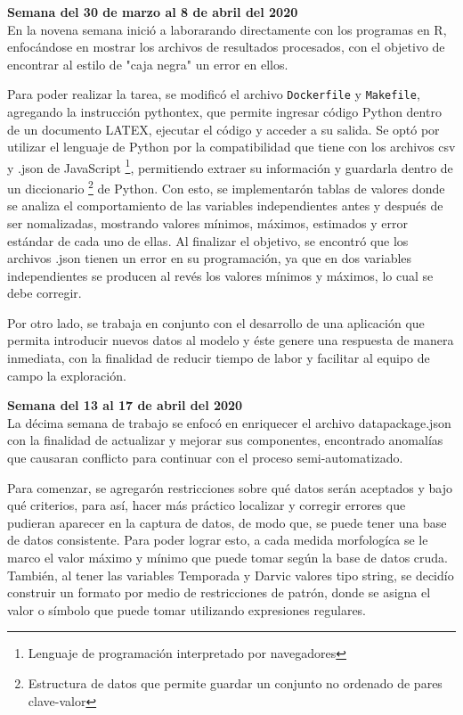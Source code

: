 \documentclass{article}
\begin{document}
    \textbf{Semana  del 30 de marzo al 8 de abril del 2020} \\
    En la novena semana inició a laborarando directamente con los programas en R, enfocándose en mostrar los archivos de resultados procesados, con el objetivo de encontrar al estilo de "caja negra" un error en ellos.
    
    Para poder realizar la tarea, se modificó el archivo \texttt{Dockerfile} y \texttt{Makefile}, agregando la instrucción pythontex, que permite ingresar código Python dentro de un documento LATEX, ejecutar el código y acceder a su salida. Se optó por utilizar el lenguaje de Python por la compatibilidad que tiene con los archivos csv y .json de JavaScript \footnote{Lenguaje de programación interpretado por navegadores}, permitiendo extraer su información y guardarla dentro de un diccionario \footnote{Estructura de datos que permite guardar un conjunto no ordenado de pares clave-valor} de Python. Con esto, se implementarón tablas de valores donde se analiza el comportamiento de las variables independientes antes y después de ser nomalizadas, mostrando valores mínimos, máximos, estimados y error estándar de cada uno de ellas.
    Al finalizar el objetivo, se encontró que los archivos .json tienen un error en su programación, ya que en dos variables independientes se producen al revés los valores mínimos y máximos, lo cual se debe corregir.
    
    Por otro lado, se trabaja en conjunto con el desarrollo de una aplicación que permita introducir nuevos datos al modelo y éste genere una respuesta de manera inmediata, con la finalidad de reducir tiempo de labor y  facilitar al equipo de campo la exploración.
    
    \textbf{Semana del 13 al 17 de abril del 2020} \\
    La décima semana de trabajo se enfocó en enriquecer el archivo datapackage.json con la finalidad de actualizar y mejorar sus componentes, encontrado anomalías que causaran conflicto para continuar con el proceso semi-automatizado.
    
    Para comenzar, se agregarón restricciones sobre qué datos serán aceptados y bajo qué criterios, para así, hacer más práctico localizar y corregir errores que pudieran aparecer en la captura de datos, de modo que, se puede tener una base de datos consistente. Para poder lograr esto, a cada medida morfologíca se le marco el valor máximo y mínimo que puede tomar según la base de datos cruda. También, al tener las variables Temporada y Darvic valores tipo string, se decidío construir un formato por medio de restricciones de patrón, donde se asigna el valor o símbolo que puede tomar utilizando expresiones regulares.
    
\end{document}
